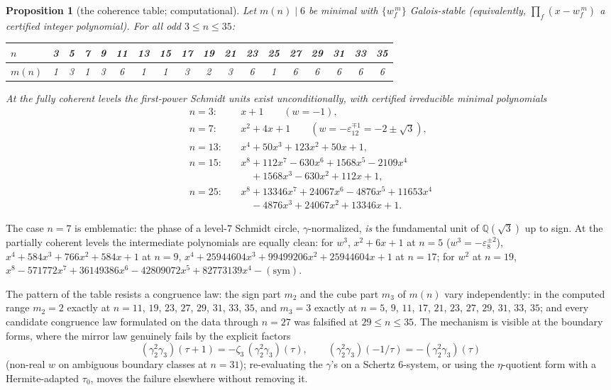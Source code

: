 \documentclass[11pt]{amsart}
\numberwithin{equation}{section}
\theoremstyle{plain}
\newtheorem{proposition}[theorem]{Proposition}
\theoremstyle{definition}
\theoremstyle{remark}
\newcommand{\Q}{\mathbb{Q}}
\newcommand{\eps}{\varepsilon}
\begin{document}
\begin{proposition}[the coherence table; computational]\label{prop:mn}
Let $m(n) \mid 6$ be minimal with $\{w_f^{\,m}\}$ Galois-stable
(equivalently, $\prod_f(x - w_f^{\,m})$ a certified integer polynomial).
For all odd $3 \le n \le 35$:
\begin{center}
\footnotesize
\setlength{\tabcolsep}{3.2pt}
\begin{tabular}{@{}l*{17}{c}@{}}
\toprule
$n$ & 3 & 5 & 7 & 9 & 11 & 13 & 15 & 17 & 19 & 21 & 23 & 25 & 27 & 29 &
31 & 33 & 35\\
\midrule
$m(n)$ & 1 & 3 & 1 & 3 & 6 & 1 & 1 & 3 & 2 & 3 & 6 & 1 & 6 & 6 & 6 & 6 & 6\\
\bottomrule
\end{tabular}
\end{center}
At the fully coherent levels the first-power Schmidt units exist
unconditionally, with certified irreducible minimal polynomials
\begin{align*}
n = 3:&\quad x + 1 \qquad (w = -1),\\
n = 7:&\quad x^2 + 4x + 1 \qquad (w = -\eps_{12}^{\mp1} = -2 \pm \sqrt3),\\
n = 13:&\quad x^4 + 50x^3 + 123x^2 + 50x + 1,\\
n = 15:&\quad x^8 + 112x^7 - 630x^6 + 1568x^5 - 2109x^4\\
       &\qquad + 1568x^3 - 630x^2 + 112x + 1,\\
n = 25:&\quad x^8 + 13346x^7 + 24067x^6 - 4876x^5 + 11653x^4\\
       &\qquad - 4876x^3 + 24067x^2 + 13346x + 1 .
\end{align*}
\end{proposition}

The case $n = 7$ is emblematic: the phase of a level-$7$ Schmidt circle,
$\gamma$-normalized, \emph{is} the fundamental unit of $\Q(\sqrt3)$ up to
sign.  At the partially coherent levels the intermediate polynomials are
equally clean: for $w^3$, $x^2 + 6x + 1$ at $n = 5$ ($w^3 =
-\eps_8^{\pm2}$), $x^4 + 584x^3 + 766x^2 + 584x + 1$ at $n = 9$,
$x^4 + 25944604x^3 + 99499206x^2 + 25944604x + 1$ at $n = 17$; for $w^2$
at $n = 19$, $x^8 - 571772x^7 + 36149386x^6 - 42809072x^5 + 82773139x^4 -
(\text{sym})$.

The pattern of the table resists a congruence law: the sign part $m_2$
and the cube part $m_3$ of $m(n)$ vary independently: in the computed
range $m_2 = 2$ exactly at $n = 11$, $19$, $23$, $27$, $29$, $31$, $33$,
$35$, and $m_3 = 3$ exactly at $n = 5$, $9$, $11$, $17$, $21$, $23$, $27$,
$29$, $31$, $33$, $35$; and every candidate congruence law formulated on
the data through $n = 27$ was falsified at $29 \le n \le 35$.  The
mechanism is visible at the boundary forms, where the mirror law
genuinely fails by the explicit factors
\[
  (\gamma_2^2\gamma_3)(\tau + 1) = -\zeta_3\,(\gamma_2^2\gamma_3)(\tau),
  \qquad
  (\gamma_2^2\gamma_3)(-1/\tau) = -(\gamma_2^2\gamma_3)(\tau)
\]
(non-real $w$ on ambiguous boundary classes at $n = 31$); re-evaluating
the $\gamma$'s on a Schertz $6$-system, or using the $\eta$-quotient form
with a Hermite-adapted $\tau_0$, moves the failure elsewhere without
removing it.
\end{document}
